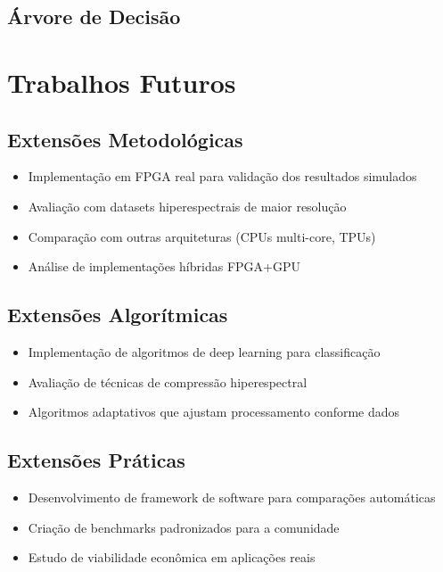 \subsection{Árvore de Decisão}

\section{Trabalhos Futuros}\label{sec:trabalhos_futuros}

\subsection{Extensões Metodológicas}
\begin{itemize}
    \item Implementação em FPGA real para validação dos resultados simulados
    \item Avaliação com datasets hiperespectrais de maior resolução
    \item Comparação com outras arquiteturas (CPUs multi-core, TPUs)
    \item Análise de implementações híbridas FPGA+GPU
\end{itemize}

\subsection{Extensões Algorítmicas}
\begin{itemize}
    \item Implementação de algoritmos de deep learning para classificação
    \item Avaliação de técnicas de compressão hiperespectral
    \item Algoritmos adaptativos que ajustam processamento conforme dados
\end{itemize}

\subsection{Extensões Práticas}
\begin{itemize}
    \item Desenvolvimento de framework de software para comparações automáticas
    \item Criação de benchmarks padronizados para a comunidade
    \item Estudo de viabilidade econômica em aplicações reais
\end{itemize}

